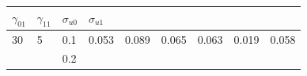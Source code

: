 \documentclass[12pt,oneside,a4paper]{reedthesis}
\begin{document}
\begin{longtable}[]{@{}lllllllll@{}}
\begin{minipage}[b]{0.08\columnwidth}
\(\gamma_{01}\)\strut
\end{minipage} & \begin{minipage}[b]{0.08\columnwidth}\raggedright
\(\gamma_{11}\)\strut
\end{minipage} & \begin{minipage}[b]{0.08\columnwidth}\raggedright
\(\sigma_{u0}\)\strut
\end{minipage} & \begin{minipage}[b]{0.08\columnwidth}\raggedright
\(\sigma_{u1}\)\strut
\end{minipage}\tabularnewline
\midrule
\endhead
\begin{minipage}[t]{0.12\columnwidth}\raggedright
30\strut
\end{minipage} & \begin{minipage}[t]{0.09\columnwidth}\raggedright
5\strut
\end{minipage} & \begin{minipage}[t]{0.06\columnwidth}\raggedright
0.1\strut
\end{minipage} & \begin{minipage}[t]{0.08\columnwidth}\raggedright
0.053\strut
\end{minipage} & \begin{minipage}[t]{0.08\columnwidth}\raggedright
0.089\strut
\end{minipage} & \begin{minipage}[t]{0.08\columnwidth}\raggedright
0.065\strut
\end{minipage} & \begin{minipage}[t]{0.08\columnwidth}\raggedright
0.063\strut
\end{minipage} & \begin{minipage}[t]{0.08\columnwidth}\raggedright
0.019\strut
\end{minipage} & \begin{minipage}[t]{0.08\columnwidth}\raggedright
0.058\strut
\end{minipage}\tabularnewline
\begin{minipage}[t]{0.12\columnwidth}\raggedright
\strut
\end{minipage} & \begin{minipage}[t]{0.09\columnwidth}\raggedright
\strut
\end{minipage} & \begin{minipage}[t]{0.06\columnwidth}\raggedright
0.2\strut
\end{minipage} & \begin{minipage}[t]{0.08\columnwidth}\raggedright

\end{minipage}
\end{longtable}
\end{document}
